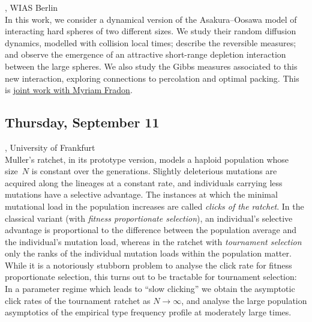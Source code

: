 \documentclass[12pt,a4paper]{article}
\begin{document}
\bigskip\bigskip

, WIAS Berlin \\[2ex] In this work, we consider a dynamical version of the Asakura--Oosawa model of interacting hard spheres of two different sizes. We study their random diffusion dynamics, modelled with collision local times; describe the reversible measures; and observe the emergence of an attractive short-range depletion interaction between the large spheres. We also study the Gibbs measures associated to this new interaction, exploring connections to percolation and optimal packing. This is \href{https://arxiv.org/abs/2502.15628}{joint work with Myriam Fradon}. 

\bigskip\bigskip

\newpage
\subsection*{\sffamily Thursday, September 11}
\bigskip\bigskip
{}, University of Frankfurt \\[2ex] Muller's ratchet, in its prototype version, models a haploid population whose size~$N$ is constant over the generations. Slightly deleterious mutations are acquired along the lineages at a constant rate, and individuals carrying less mutations have a selective advantage. The instances at which the minimal mutational load in the population increases are called {\em clicks of the ratchet}.  In the classical variant (with {\em fitness proportionate selection}), an individual's selective advantage is proportional to the difference between the population average and the individual's mutation load, whereas in the ratchet with {\em  tournament selection}  only the ranks of the  individual mutation loads within the population matter. While it is a notoriously stubborn problem to analyse the click rate for fitness proportionate selection, this turns out to be tractable for tournament selection:   In a parameter regime which leads to ``slow clicking'' we obtain the  asymptotic click rates of the tournament ratchet as $N\to \infty$, and analyse the large population asymptotics of the empirical type frequency profile at moderately large times. 
\end{document}
